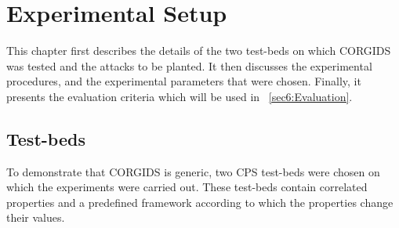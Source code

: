 
\chapter{\textbf{Experimental Setup}}
\label{sec4:ExperimentalDetail}

This chapter first describes the details of the two test-beds on which CORGIDS was tested and the attacks to be planted. It then discusses the experimental procedures, and the experimental parameters that were chosen. Finally, it presents the evaluation criteria which will be used in ~\autoref{sec6:Evaluation}.

\section{Test-beds}
To demonstrate that CORGIDS is generic, two CPS test-beds were chosen on which the experiments were carried out. These test-beds contain correlated properties and a predefined framework according to which the properties change their values. 
